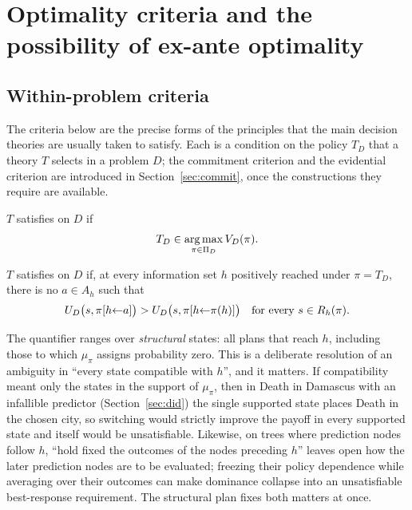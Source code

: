 \section{Optimality criteria and the possibility of ex-ante optimality}\label{sec:criteria}

\subsection{Within-problem criteria}

The criteria below are the precise forms of the principles that the main decision theories are
usually taken to satisfy. Each is a condition on the policy $T_D$ that a theory $T$ selects in a
problem $D$; the commitment criterion  and the evidential criterion  are introduced in
Section~\ref{sec:commit}, once the constructions they require are available.

\begin{definition}
$T$ satisfies  on $D$ if \[ T_D\in\operatorname*{arg\,max}_{\pi\in\Pi_D}V_D(\pi). \]
\end{definition}

\begin{definition}
$T$ satisfies  on $D$ if, at every information set $h$ positively reached under $\pi=T_D$,
there is no $a\in A_h$ such that
\[
  U_D\bigl(s,\pi[h{\leftarrow}a]\bigr)>U_D\bigl(s,\pi[h{\leftarrow}\pi(h)]\bigr)
  \quad\text{for every }s\in R_h(\pi).
\]
\end{definition}

The quantifier ranges over \emph{structural} states: all plans that reach $h$, including those to
which $\mu_\pi$ assigns probability zero. This is a deliberate resolution of an ambiguity in
\enquote{every state compatible with $h$}, and it matters. If compatibility meant only the states in
the support of $\mu_\pi$, then in Death in Damascus with an infallible predictor (Section~\ref{sec:did})
the single supported state places Death in the chosen city, so switching would strictly improve the
payoff in every supported state and  itself would be unsatisfiable. Likewise, on trees where
prediction nodes follow $h$, \enquote{hold fixed the outcomes of the nodes preceding $h$} leaves open
how the later prediction nodes are to be evaluated; freezing their policy dependence while
averaging over their outcomes can make dominance collapse into an unsatisfiable best-response
requirement. The structural plan fixes both matters at once.

